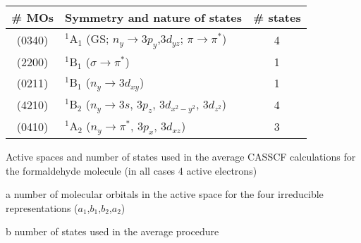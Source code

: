 \begin{center}
\begin{threeparttable}
\begin{tabular*}{0.80\textwidth}{clc}
\hline
\# MOs\tnote{a} & Symmetry and nature of states    & \# states\tnote{b} \\
\hline
    (0340)   & $^1$A$_1$ (GS; $n_y\!\rightarrow\!3p_y$,$3d_{yz}$; $\pi\!\rightarrow\!\pi^*$) & 4 \\
    (2200)   & $^1$B$_1$ ($\sigma\!\rightarrow\!\pi^*$) & 1\\
    (0211)   & $^1$B$_1$ ($n_y\!\rightarrow\! 3d_{xy}$) & 1 \\
    (4210)   & $^1$B$_2$ ($n_y\!\rightarrow\!3s$, $3p_z$, $3d_{x^2\!-\!y^2}$, $3d_{z^2}$) & 4 \\
    (0410)   & $^1$A$_2$ ($n_y\!\rightarrow\! \pi^*$, $3p_x$, $3d_{xz}$) & 3 \\
\hline
\end{tabular*}
\caption{\footnotesize Active spaces and number of states used in the average CASSCF calculations
for the formaldehyde molecule (in all cases 4 active electrons)}
\label{tbl:form_act}       
\begin{tablenotes}
\footnotesize
\item[a] number of molecular orbitals in the active space for the four
irreducible representations ($a_1$,$b_1$,$b_2$,$a_2$)
\item[b] number of states used in the average procedure
\end{tablenotes}
\end{threeparttable}
\end{center}
